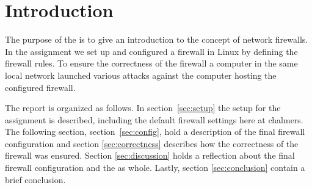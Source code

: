 \section{Introduction} 
\label{sec:intro}

The purpose of the \lab is to give an introduction to the concept of network firewalls. In the assignment we set up and configured a firewall in Linux by defining the firewall rules. To ensure the correctness of the firewall a computer in the same local network launched various attacks against the computer hosting the configured firewall. 

The report is organized as follows. In section~\ref{sec:setup} the setup for the assignment is described, including the default firewall settings here at chalmers. The following section, section~\ref{sec:config}, hold a description of the final firewall configuration and section \ref{sec:correctness} describes how the correctness of the firewall was ensured. Section \ref{sec:discussion} holds a reflection about the final firewall configuration and the \lab as whole. Lastly, section \ref{sec:conclusion} contain a brief conclusion.